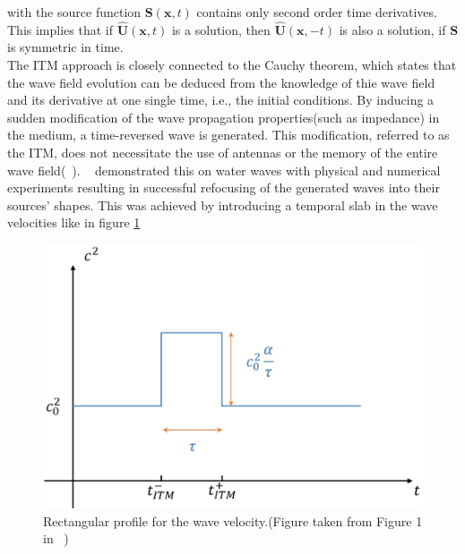 with the source function $\mathbf{S}\left(\mathbf{x},t\right)$ contains only second order time derivatives. This implies that if $\hat{\mathbf{U}}\left(\mathbf{x},t\right)$
is a solution, then $\hat{\mathbf{U}}\left(\mathbf{x}, -t\right)$ is also a solution, if $\mathbf{S}$ is symmetric in time. \\

The \ac{ITM} approach is closely connected to the Cauchy theorem, which states that the wave field evolution can be deduced from the knowledge of thie wave field
and its derivative at one single time, i.e., the initial conditions. By inducing a sudden modification of the wave propagation properties(such as impedance) in the
medium, a time-reversed wave is generated. This modification, referred to as the \ac{ITM}, does not necessitate the use of antennas or the memory of the entire wave
field(~\parencite{Bacot2016}). ~\parencite{Bacot2016} demonstrated this on water waves with physical and numerical experiments resulting in successful refocusing of the generated waves into their
sources' shapes. This was achieved by introducing a temporal slab in the wave velocities like in figure \ref{fig:deltavelocity}

\begin{figure}
    \centering
    \includegraphics[width=0.6\linewidth]{figures/delta_speed.png}
    \caption{Rectangular profile for the wave velocity.(Figure taken from Figure 1 in ~\parencite[Supplementary Material]{Bacot2016})}
    \label{fig:deltavelocity}
\end{figure}

